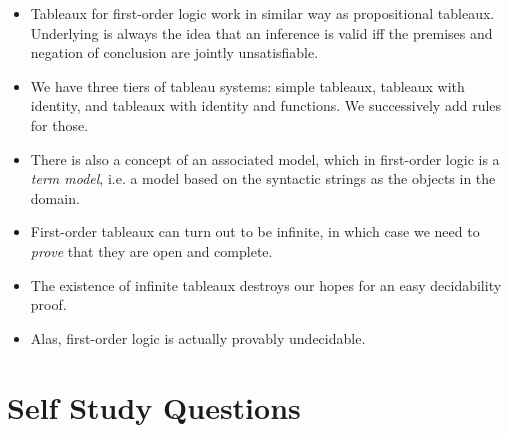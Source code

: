 \begin{itemize}
	
		\item Tableaux for first-order logic work in similar way as propositional tableaux. Underlying is always the idea that an inference is valid iff the premises and negation of conclusion are jointly unsatisfiable.				
		\item We have three tiers of tableau systems: simple tableaux, tableaux with identity, and tableaux with identity and functions. We successively add rules for those.
		
		\item There is also a concept of an associated model, which in first-order logic is a \emph{term model}, i.e. a model based on the syntactic strings as the objects in the domain.
		
		\item First-order tableaux can turn out to be infinite, in which case we need to \emph{prove} that they are open and complete.
		
		\item The existence of infinite tableaux destroys our hopes for an easy decidability proof.
		
		\item Alas, first-order logic is actually provably undecidable.
	
	\end{itemize}


\section{Self Study Questions}

